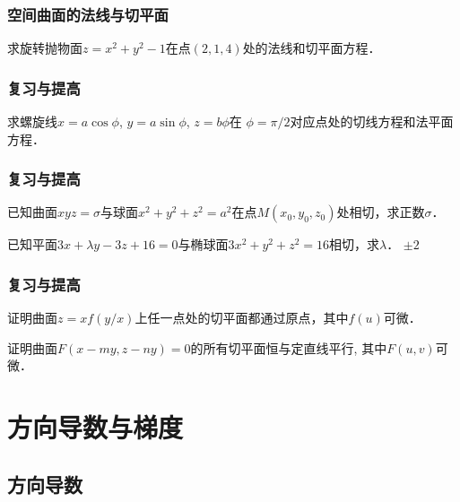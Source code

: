 \documentclass[14pt,notheorems,leqno,xcolor={rgb}]{beamer} %
\begin{document}
\begin{frame}
\frametitle{空间曲面的法线与切平面}
\begin{example}
求旋转抛物面$z=x^2+y^2-1$在点$(2,1,4)$处的法线和切平面方程．
\end{example}
\end{frame}


\begin{frame}
\frametitle{复习与提高}
\begin{puzzle}
求螺旋线$x=a\cos\phi$, $y=a\sin\phi$, $z=b\phi$在
$\phi=\pi/2$对应点处的切线方程和法平面方程．
\end{puzzle}
\end{frame}

\begin{frame}
\frametitle{复习与提高}
\begin{puzzle}
已知曲面$xyz=\sigma$与球面$x^2+y^2+z^2=a^2$在点$M(x_0,y_0,z_0)$处相切，求正数$\sigma$．
\end{puzzle}
\vpause
\begin{puzzle}
已知平面$3x+\lambda y-3z+16=0$与椭球面$3x^2+y^2+z^2=16$相切，求$\lambda$．
\pause\cdotfill$\pm2$
\end{puzzle}
\end{frame}

\begin{frame}
\frametitle{复习与提高}
\begin{puzzle}
证明曲面$z=xf(y/x)$上任一点处的切平面都通过原点，其中$f(u)$可微．
\end{puzzle}
\vpause
\begin{puzzle}
证明曲面$F(x-my,z-ny)=0$的所有切平面恒与定直线平行, 其中$F(u,v)$可微．
\end{puzzle}
\end{frame}

\section{方向导数与梯度}

\subsection{方向导数}

\end{document}
